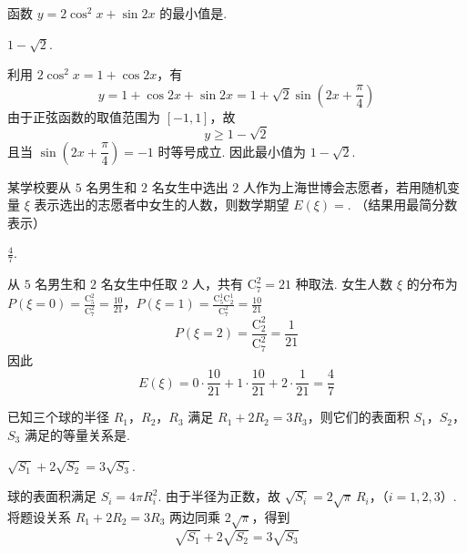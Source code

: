\begin{problem}
函数 \(y = 2\cos^2 x + \sin 2x\) 的最小值是\fillinblank{}.
\end{problem}

\begin{answer}
\(1 - \sqrt{2}\).
\end{answer}

\begin{solution}
利用 \(2\cos^2x=1+\cos2x\)，有
\[
y=1+\cos2x+\sin2x=1+\sqrt{2}\sin\left(2x+\frac{\pi}{4}\right)
\]
由于正弦函数的取值范围为 \([-1,1]\)，故
\[
y\geqslant1-\sqrt{2}
\]
且当 \(\sin\left(2x+\dfrac{\pi}{4}\right)=-1\) 时等号成立. 因此最小值为 \(1-\sqrt{2}\).
\end{solution}

\begin{problem}
某学校要从 \(5\) 名男生和 \(2\) 名女生中选出 \(2\) 人作为上海世博会志愿者，若用随机变量 \(\xi\) 表示选出的志愿者中女生的人数，则数学期望 \(E(\xi) =\)\fillinblank{}. （结果用最简分数表示）
\end{problem}

\begin{answer}
\(\frac{4}{7}\).
\end{answer}

\begin{solution}
从 \(5\) 名男生和 \(2\) 名女生中任取 \(2\) 人，共有 \(\mathrm C_7^2=21\) 种取法. 女生人数 \(\xi\) 的分布为
\(P(\xi=0)=\frac{\mathrm C_5^2}{\mathrm C_7^2}=\frac{10}{21}\)，\(P(\xi=1)=\frac{\mathrm C_5^1\mathrm C_2^1}{\mathrm C_7^2}=\frac{10}{21}\)
\[
P(\xi=2)=\frac{\mathrm C_2^2}{\mathrm C_7^2}=\frac{1}{21}
\]
因此
\[
E(\xi)=0\cdot\frac{10}{21}+1\cdot\frac{10}{21}+2\cdot\frac{1}{21}=\frac{4}{7}
\]
\end{solution}

\begin{problem}
已知三个球的半径 \(R_1\)，\(R_2\)，\(R_3\) 满足 \(R_1 + 2R_2 = 3R_3\)，则它们的表面积 \(S_1\)，\(S_2\)，\(S_3\) 满足的等量关系是\fillinblank{}.
\end{problem}

\begin{answer}
\(\sqrt{S_1} + 2\sqrt{S_2} = 3\sqrt{S_3}\).
\end{answer}

\begin{solution}
球的表面积满足 \(S_i=4\pi R_i^2\). 由于半径为正数，故
\(\sqrt{S_i}=2\sqrt{\pi}\,R_i\)，（\(i=1,2,3\)）.
将题设关系 \(R_1+2R_2=3R_3\) 两边同乘 \(2\sqrt{\pi}\)，得到
\[
\sqrt{S_1}+2\sqrt{S_2}=3\sqrt{S_3}
\]
\end{solution}

